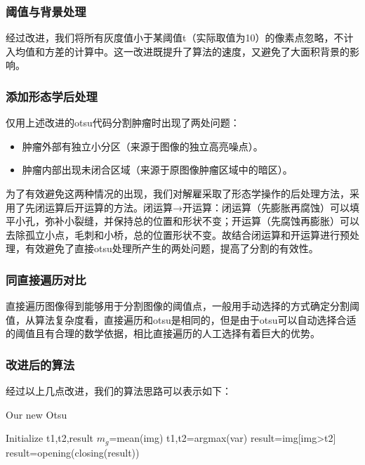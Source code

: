 \documentclass[UTF8]{ctexart}
\begin{document}
\subsubsection*{阈值与背景处理}
经过改进，我们将所有灰度值小于某阈值t（实际取值为10）的像素点忽略，不计入均值和方差的计算中。这一改进既提升了算法的速度，又避免了大面积背景的影响。


\subsubsection*{添加形态学后处理}
仅用上述改进的otsu代码分割肿瘤时出现了两处问题：
\begin{itemize}
    \item 肿瘤外部有独立小分区（来源于图像的独立高亮噪点）。
    \item 肿瘤内部出现未闭合区域（来源于原图像肿瘤区域中的暗区）。
\end{itemize}

为了有效避免这两种情况的出现，我们对解雇采取了形态学操作的后处理方法，采用了先闭运算后开运算的方法。闭运算→开运算：闭运算（先膨胀再腐蚀）可以填平小孔，弥补小裂缝，并保持总的位置和形状不变；开运算（先腐蚀再膨胀）可以去除孤立小点，毛刺和小桥，总的位置形状不变。故结合闭运算和开运算进行预处理，有效避免了直接otsu处理所产生的两处问题，提高了分割的有效性。

\subsubsection*{同直接遍历对比}

直接遍历图像得到能够用于分割图像的阈值点，一般用手动选择的方式确定分割阈值，从算法复杂度看，直接遍历和otsu是相同的，但是由于otsu可以自动选择合适的阈值且有合理的数学依据，相比直接遍历的人工选择有着巨大的优势。

\subsubsection*{改进后的算法}
经过以上几点改进，我们的算法思路可以表示如下：

\begin{algorithm}[H]
    \caption{Our new Otsu}\label{algorithm}
        Initialize t1,t2,result\;
        $m_g$=mean(img)\;
        t1,t2=argmax(var)\;
        result=img[img>t2]\;
        result=opening(closing(result))\;
        
        
\end{algorithm}
\end{document}

